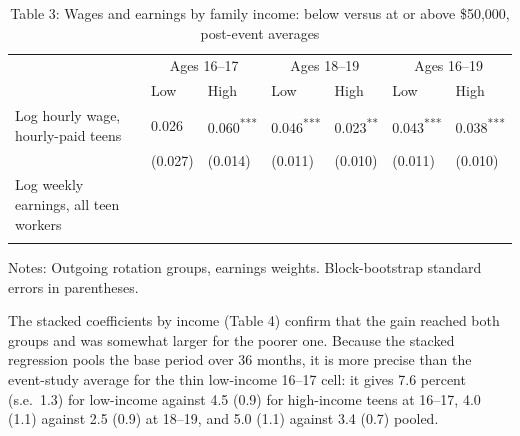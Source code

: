 \documentclass[12pt]{article}
\begin{document}
\begin{table}
\centering
\caption{Table 3: Wages and earnings by family income: below versus at or above \$50,000, post-event averages}

\small
\begin{tabular}{p{}p{}p{}p{}p{}p{}p{}}
\toprule
 & \multicolumn{2}{c}{Ages 16--17} & \multicolumn{2}{c}{Ages 18--19} & \multicolumn{2}{c}{Ages 16--19} \\

 & Low & High & Low & High & Low & High \\
\midrule
Log hourly wage, hourly-paid teens & 0.026 & 0.060\textsuperscript{***} & 0.046\textsuperscript{***} & 0.023\textsuperscript{**} & 0.043\textsuperscript{***} & 0.038\textsuperscript{***} \\
 & (0.027) & (0.014) & (0.011) & (0.010) & (0.011) & (0.010) \\
Log weekly earnings, all teen workers &  &  &  &  &  &  \\
 &  &  &  &  &  &  \\
\bottomrule
\end{tabular}



\noindent\small Notes: Outgoing rotation groups, earnings weights. Block-bootstrap standard errors in parentheses.

\end{table}

The stacked coefficients by income (Table 4) confirm that the gain reached both groups and was somewhat larger for the poorer one. Because the stacked regression pools the base period over 36 months, it is more precise than the event-study average for the thin low-income 16--17 cell: it gives 7.6 percent (s.e.\ 1.3) for low-income against 4.5 (0.9) for high-income teens at 16--17, 4.0 (1.1) against 2.5 (0.9) at 18--19, and 5.0 (1.1) against 3.4 (0.7) pooled.
\end{document}
